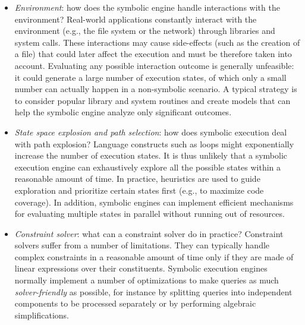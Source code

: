 \begin{itemize}
  \item {\em Environment}: how does the symbolic engine handle interactions with the environment?
  Real-world applications constantly interact with the environment (e.g., the file system or the network) through libraries and system calls. These interactions may cause side-effects
(such as the creation of a file) that could later affect the execution and must be therefore taken into account. Evaluating any possible interaction outcome is generally unfeasible: it could generate a large number of execution states, of which only a small number can actually happen in a non-symbolic scenario. A typical strategy is to consider popular library and system routines and create models that can help the symbolic engine analyze only significant outcomes.
\vspace{1mm}

  \item {\em State space explosion and path selection}: how does symbolic execution deal with path explosion?
Language constructs such as loops might exponentially increase the number of execution states. It is thus unlikely that a symbolic execution engine can exhaustively explore all the possible states within a reasonable amount of time. In practice, heuristics are used to guide exploration and prioritize certain states first (e.g., to maximize code coverage). In addition, symbolic engines can implement efficient mechanisms for evaluating multiple states in parallel without running out of resources.
\vspace{1mm}

  \item {\em Constraint solver}: what can a constraint solver do in practice?
 Constraint solvers suffer from a number of limitations. They can typically handle complex constraints in a reasonable amount of time only if they are made of linear expressions over their constituents. Symbolic execution engines normally implement a number of optimizations to make queries as much {\em solver-friendly} as possible, for instance by splitting queries into independent components to be processed separately or by performing algebraic simplifications.
\vspace{1mm}


\end{itemize}
